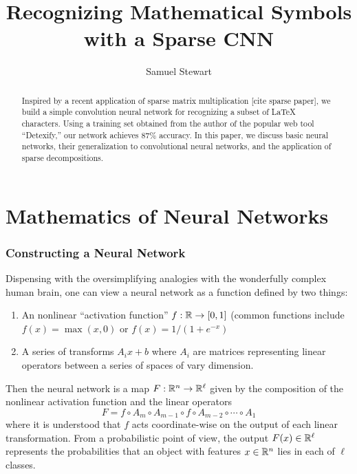 \documentclass[12pt,letterpaper,boxed]{article}
\author{Samuel Stewart}
\title{Recognizing Mathematical Symbols with a Sparse CNN}
\begin{document}
\maketitle

\begin{abstract}
Inspired by a recent application of sparse matrix multiplication [cite sparse paper],  we build a simple convolution neural network for recognizing a subset of LaTeX characters. Using a training set obtained from the author of the popular web tool ``Detexify,'' our network achieves $87\%$ accuracy. In this paper, we discuss basic neural networks, their generalization to convolutional neural networks, and the application of sparse decompositions.
\end{abstract}

\section{Mathematics of Neural Networks}

	\subsubsection{Constructing a Neural Network}
	Dispensing with the oversimplifying analogies with the wonderfully complex human brain, one can view a neural network as a function defined by two things:
	\begin{enumerate}
		\item An nonlinear ``activation function'' $f : {\mathbb{R}} \to [0, 1]$ (common functions include $f(x) = \max(x, 0)$ or $f(x) = 1 / (1 + e^{-x})$
		\item A series of transforms $A_i x + b$ where $A_i$ are matrices representing linear operators between a series of spaces of vary dimension.
	\end{enumerate}
	Then the neural network is a map $F : {\mathbb{R}}^n \to {\mathbb{R}}^\ell$ given by the composition of the nonlinear activation function and the linear operators
	\[
		F = f  \circ A_m \circ A_{m - 1} \circ f \circ A_{m - 2} \circ \cdots \circ A_1
	\]
	where it is understood that $f$ acts coordinate-wise on the output of each linear transformation. 
	From a probabilistic point of view, the output $F(x) \in {\mathbb{R}}^\ell$ represents the probabilities that an object with features $x \in {\mathbb{R}}^n$ lies in each of $\ell$ classes.
	
\end{document}
